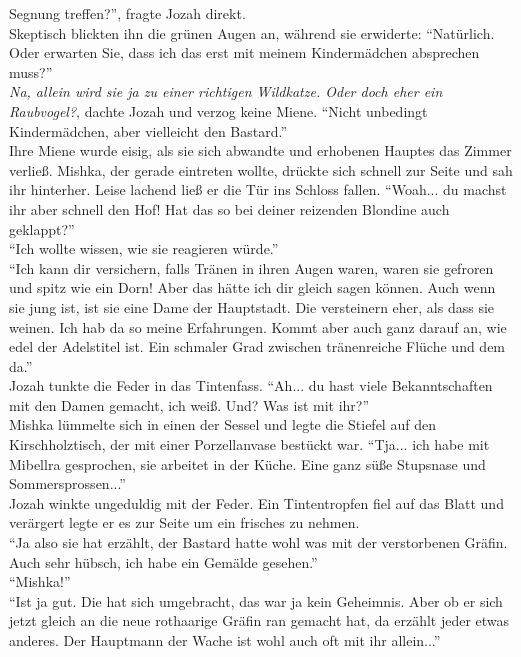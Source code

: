 Segnung treffen?'', fragte Jozah direkt.\\
Skeptisch blickten ihn die grünen Augen an, während sie erwiderte: ``Natürlich. Oder erwarten Sie, 
dass ich das erst mit meinem Kindermädchen absprechen muss?''\\
\textit{Na, allein wird sie ja zu einer richtigen Wildkatze. Oder doch eher ein Raubvogel?}, dachte 
Jozah und verzog keine Miene. ``Nicht unbedingt Kindermädchen, aber vielleicht den Bastard.''\\
Ihre Miene wurde eisig, als sie sich abwandte und erhobenen Hauptes das Zimmer verließ. Mishka, der 
gerade eintreten wollte, drückte sich schnell zur Seite und sah ihr hinterher. Leise lachend ließ 
er die Tür ins Schloss fallen. ``Woah... du machst ihr aber schnell den Hof! Hat das so bei deiner 
reizenden Blondine auch geklappt?''\\
``Ich wollte wissen, wie sie reagieren würde.''\\
``Ich kann dir versichern, falls Tränen in ihren Augen waren, waren sie gefroren und spitz wie ein 
Dorn! Aber das hätte ich dir gleich sagen können. Auch wenn sie jung ist, ist sie eine Dame der 
Hauptstadt. Die versteinern eher, als dass sie weinen. Ich hab da so meine Erfahrungen. Kommt aber 
auch ganz darauf an, wie edel der Adelstitel ist. Ein schmaler Grad zwischen tränenreiche Flüche 
und dem da.''\\
Jozah tunkte die Feder in das Tintenfass. ``Ah... du hast viele Bekanntschaften mit den 
Damen gemacht, ich weiß. Und? Was ist mit ihr?''\\
Mishka lümmelte sich in einen der Sessel und legte die Stiefel auf den Kirschholztisch, der mit 
einer Porzellanvase bestückt war. ``Tja... ich habe mit Mibellra gesprochen, sie arbeitet in der 
Küche. Eine ganz süße Stupsnase und Sommersprossen...''\\
Jozah winkte ungeduldig mit der Feder. Ein Tintentropfen fiel auf das Blatt und verärgert legte er 
es zur Seite um ein frisches zu nehmen.\\
``Ja also sie hat erzählt, der Bastard hatte wohl was mit der verstorbenen Gräfin. Auch sehr 
hübsch, ich habe ein Gemälde gesehen.''\\
``Mishka!''\\
``Ist ja gut. Die hat sich umgebracht, das war ja kein Geheimnis. Aber ob er sich jetzt gleich an 
die neue rothaarige Gräfin ran gemacht hat, da erzählt jeder etwas anderes. Der Hauptmann der Wache 
ist wohl auch oft mit ihr allein...''\\
